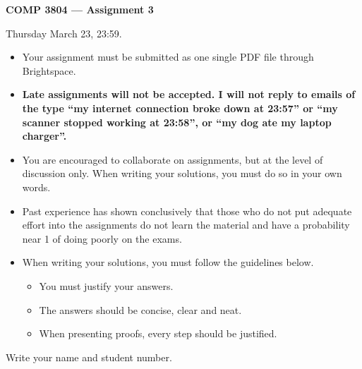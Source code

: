 \documentclass[12pt]{article}
\newcounter{ques}
\newenvironment{question}{\stepcounter{ques}{\noindent\bf Question \arabic{ques}:}}{\vspace{5mm}}
\begin{document}
 

\begin{center} \Large\bf
COMP 3804 --- Assignment 3 
\end{center} 

 Thursday March 23, 23:59.

\vspace{0.5em}

\begin{itemize}
\item Your assignment must be submitted as one single PDF file through
      Brightspace.

\begin{center}
\hfill{}
\end{center}
\item {\bf Late assignments will not be accepted. I will not reply to
      emails of the type ``my internet connection broke down at
      23:57'' or ``my scanner stopped working at 23:58'', or
      ``my dog ate my laptop charger''.}
\item You are encouraged to collaborate on assignments, but at the level
      of discussion only. When writing your solutions, you must do so
      in your own words.
\item Past experience has shown conclusively that those who do not put
      adequate effort into the assignments do not learn the material and
      have a probability near 1 of doing poorly on the exams.
\item When writing your solutions, you must follow the guidelines below.
      \begin{itemize}
      \item You must justify your answers.
      \item The answers should be concise, clear and neat.
      \item When presenting proofs, every step should be justified.
      \end{itemize}
\end{itemize}

\newpage 

\begin{question}
Write your name and student number.
\end{question}
\end{document}
